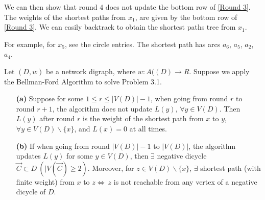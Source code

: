 We can then show that round $4$ does not update the bottom row of \ref{Round 3}. The weights of the shortest paths from $x_1$, are given by the bottom row of \ref{Round 3}. We can easily backtrack to obtain the shortest paths tree from $x_1$.



For example, for $x_5$, see the circle entries. The shortest path has arcs $a_6$, $a_5$, $a_2$, $a_4$.

\begin{theorem}
    Let $(D, w)$ be a network digraph, where $w: A((D)\to R$. Suppose we apply the Bellman-Ford Algorithm to solve Problem 3.1.
    \begin{itemize}
        \item[\textbf{(a)}] Suppose for some $1\leqslant r\leqslant |V(D)|-1$, when going from round $r$ to round $r+1$, the algorithm does not update $L(y)$, $\forall y\in V(D)$. Then $L(y)$ after round $r$ is the weight of the shortest path from $x$ to $y$, $\forall y\in V(D)\backslash\{x\}$, and $L(x)=0$ at all times.
        \item[\textbf{(b)}] If when going from round $|V(D)|-1$ to $|V(D)|$, the algorithm updates $L(y)$ for some $y\in V(D)$, then $\exists$ negative dicycle $\vec{C}\subset D\ (|V(\vec{C}) \geqslant 2)$. Moreover, for $z\in V(D)\backslash \{x\}$, $\exists$ shortest path (with finite weight) from $x$ to $z\Longleftrightarrow\ z$ is not reachable from any vertex of a negative dicycle of $D$.
    \end{itemize} 
\end{theorem}

